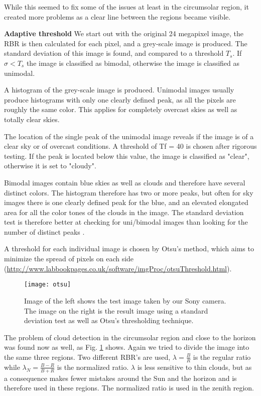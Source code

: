 \documentclass[]{book}
\begin{document}
		While this seemed to fix some of the issues at least in the circumsolar region, it created more problems as a clear line between the regions became visible.

		\textbf{Adaptive threshold}
		We start out with the original 24 megapixel image, the RBR is then calculated for each pixel, and a grey-scale image is produced. The standard deviation of this image is found, and compared to a threshold $T_s$. If $\sigma < T_s $ the image is classified as bimodal, otherwise the image is classified as unimodal. 
		
		A histogram of the grey-scale image is produced. Unimodal images usually produce histograms with only one clearly defined peak, as all the pixels are roughly the same color. This applies for completely overcast skies as well as totally clear skies.
		
		The location of the single peak of the unimodal image reveals if the image is of a clear sky or of overcast conditions. A threshold of Tf = 40 is chosen after rigorous testing. If the peak is located below this value, the image is classified as "clear", otherwise it is set to "cloudy".
		 
		Bimodal images contain blue skies as well as clouds and therefore have several distinct colors. The histogram therefore has two or more peaks, but often for sky images there is one clearly defined peak for the blue, and an elevated elongated area for all the color tones of the clouds in the image. The standard deviation test is therefore better at checking for uni/bimodal images than looking for the number of distinct peaks \cite{Thresholding}.
		
		A threshold for each individual image is chosen by Otsu’s method, which aims to minimize the spread of pixels on each side (\url{http://www.labbookpages.co.uk/software/imgProc/otsuThreshold.html}).

		\begin{figure} [ht]
			\centering
			\texttt{[image: otsu]}
			\caption{Image of the left shows the test image taken by our Sony camera. The image on the right is the result image using a standard deviation test as well as Otsu’s thresholding technique.}
			\label{fig: otsu}
		\end{figure}

		The problem of cloud detection in the circumsolar region and close to the horizon was found now as well, as Fig. \ref{fig: otsu} shows. Again we tried to divide the image into the same three regions. Two different RBR’s are used, $\lambda = \frac{B}{R}$ is the regular ratio while $\lambda_N = \frac{B - R}{B + R}$ is the normalized ratio. $\lambda$ is less sensitive to thin clouds, but as a consequence makes fewer mistakes around the Sun and the horizon and is therefore used in these regions. The normalized ratio is used in the zenith region.
		
\end{document}
